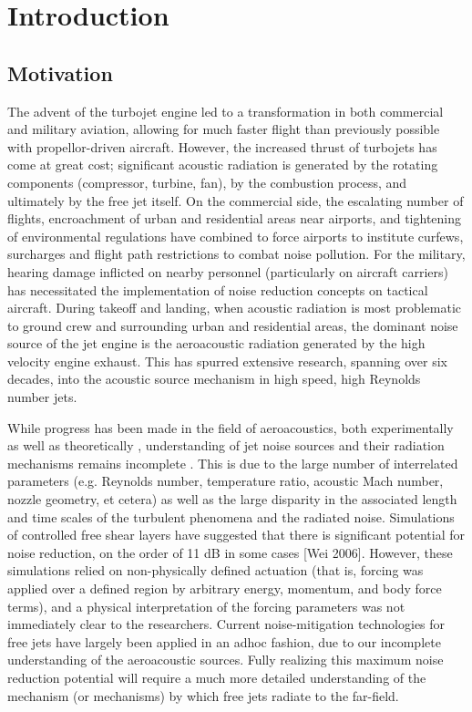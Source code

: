 \chapter{Introduction}
\label{introduction}
\section{Motivation}
The advent of the turbojet engine led to a transformation in both commercial and military aviation, allowing for much faster flight than previously possible with propellor-driven aircraft. 
However, the increased thrust of turbojets has come at great cost; significant acoustic radiation is generated by the rotating components (compressor, turbine, fan), by the combustion process, and ultimately by the free jet itself. 
On the commercial side, the escalating number of flights, encroachment of urban and residential areas near airports, and tightening of environmental regulations have combined to force airports to institute curfews, surcharges and flight path restrictions to combat noise pollution. 
For the military, hearing damage inflicted on nearby personnel (particularly on aircraft carriers) has necessitated the implementation of noise reduction concepts on tactical aircraft.
During takeoff and landing, when acoustic radiation is most problematic to ground crew and  surrounding urban and residential areas, the dominant noise source of the jet engine is the aeroacoustic radiation generated by the high velocity engine exhaust.
This has spurred extensive research, spanning over six decades, into the acoustic source mechanism in high speed, high Reynolds number jets. 

While progress has been made in the field of aeroacoustics, both experimentally \citep{Tam1996, Viswanathan2006, Tam2008} as well as theoretically \citep{Cabana2008}, understanding of jet noise sources and their radiation mechanisms remains incomplete \citep{Jordan2008}.
This is due to the large number of interrelated parameters (e.g. Reynolds number, temperature ratio, acoustic Mach number, nozzle geometry, et cetera) as well as the large disparity in the associated length and time scales of the turbulent phenomena and the radiated noise.
Simulations of controlled free shear layers have suggested that there is significant potential for noise reduction, on the order of 11 dB in some cases [Wei 2006].
However, these simulations relied on non-physically defined actuation (that is, forcing was applied over a defined region by arbitrary energy, momentum, and body force terms), and a physical interpretation of the forcing parameters was not immediately clear to the researchers.
Current noise-mitigation technologies for free jets have largely been applied in an adhoc fashion, due to our incomplete understanding of the aeroacoustic sources.
Fully realizing this maximum noise reduction potential will require a much more detailed understanding of the mechanism (or mechanisms) by which free jets radiate to the far-field.


